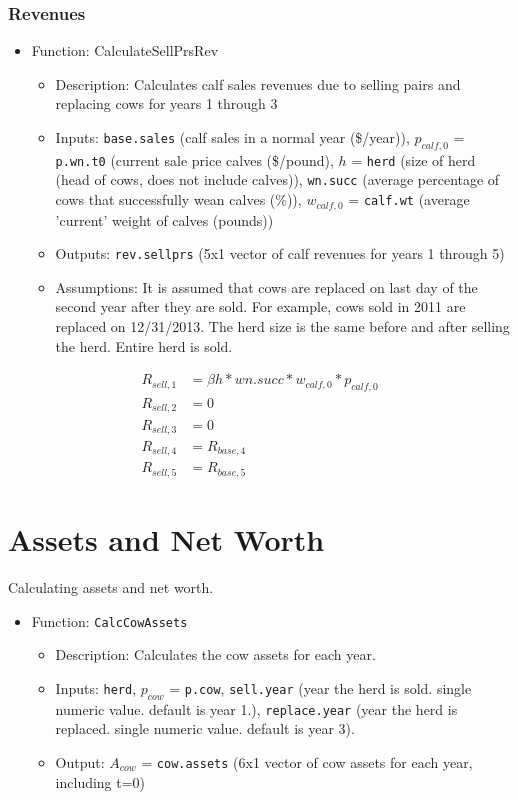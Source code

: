 \documentclass[11pt]{article}
\begin{document}
\subsubsection{Revenues}
\begin{itemize}
\item   Function: CalculateSellPrsRev
	\begin{itemize}
	\item Description: Calculates calf sales revenues due to selling pairs and replacing cows for years 1 through 3
  	\item Inputs: \verb!base.sales! (calf sales in a normal year (\$/year)), $p_{calf, 0}$ = \verb!p.wn.t0! (current sale price calves (\$/pound), $h$ = \verb!herd! (size of herd (head of cows, does not include calves)), \verb!wn.succ! (average percentage of cows that successfully wean calves (\%)), $w_{calf, 0}$ = \verb!calf.wt! (average 'current' weight of calves (pounds))
  	\item Outputs: \verb!rev.sellprs! (5x1 vector of calf revenues for years 1 through 5)
  	\item Assumptions: It is assumed that cows are replaced on last day of the second year after they are sold. 
  For example, cows sold in 2011 are replaced on 12/31/2013. The herd size is the same before and after selling the herd. Entire herd is sold.
	\end{itemize}
\end{itemize}
\begin{align*}
R_{sell, 1} &= \beta h * wn.succ * w_{calf, 0} * p_{calf, 0} \\
R_{sell, 2} &= 0 \\
R_{sell, 3} &= 0 \\
R_{sell, 4} &= R_{base, 4} \\
R_{sell, 5} &= R_{base, 5}
\end{align*}

\section{Assets and Net Worth}
Calculating assets and net worth.

\begin{itemize}
\item Function: \verb!CalcCowAssets!
	\begin{itemize}
	\item Description: Calculates the cow assets for each year.
	\item Inputs: \verb!herd!, $p_{cow}$ = \verb!p.cow!, \verb!sell.year! (year the herd is sold. single numeric value. default is year 1.), \verb!replace.year! (year the herd is replaced. single numeric value. default is year 3).
	\item Output: $A_{cow}$ = \verb!cow.assets! (6x1 vector of cow assets for each year, including t=0)
	\end{itemize}
\end{itemize}
\end{document}
